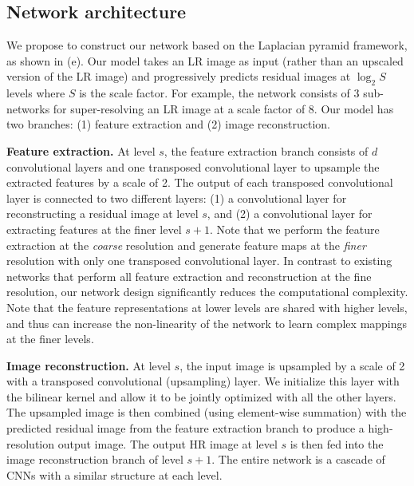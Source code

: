 \documentclass[10pt,twocolumn,letterpaper]{article}
\begin{document}
	\subsection{Network architecture}
	\label{sec:architecture}
	\vspace{-0.1cm}
	We propose to construct our network based on the Laplacian pyramid framework, as shown in (e).
	Our model takes an LR image as input (rather than an upscaled version of the LR image) and progressively predicts residual images at $\log_2 S$ levels where $S$ is the scale factor.
	For example, the network consists of $3$ sub-networks for super-resolving an LR image at a scale factor of $8$.
	Our model has two branches: (1) feature extraction and (2) image reconstruction.
	
	\noindent\textbf{Feature extraction.} 
	At level $s$, the feature extraction branch consists of $d$ convolutional layers and one transposed convolutional layer to upsample the extracted features by a scale of 2.
	The output of each transposed convolutional layer is connected to two different layers:
	(1) a convolutional layer for reconstructing a residual image at level $s$, 
	and (2) a convolutional layer for extracting features at the finer level $s+1$.
	Note that we perform the feature extraction at the \emph{coarse} resolution and generate feature maps at the \emph{finer} resolution with only one transposed convolutional layer.
	In contrast to existing networks that perform all feature extraction and reconstruction at the fine resolution, our network design significantly reduces the computational complexity.
	Note that the feature representations at lower levels are shared with higher levels, and thus can increase the non-linearity of the network to learn complex mappings at the finer levels.
	
	\noindent\textbf{Image reconstruction.} 
	At level $s$, the input image is upsampled by a scale of 2 with a transposed convolutional (upsampling) layer.
	We initialize this layer with the bilinear kernel and allow it to be jointly optimized with all the other layers.
	The upsampled image is then combined (using element-wise summation) with the predicted residual image from the feature extraction branch to produce a high-resolution output image.
	The output HR image at level $s$ is then fed into the image reconstruction branch of level $s+1$.
	The entire network is a cascade of CNNs with a similar structure at each level.
	
\end{document}
